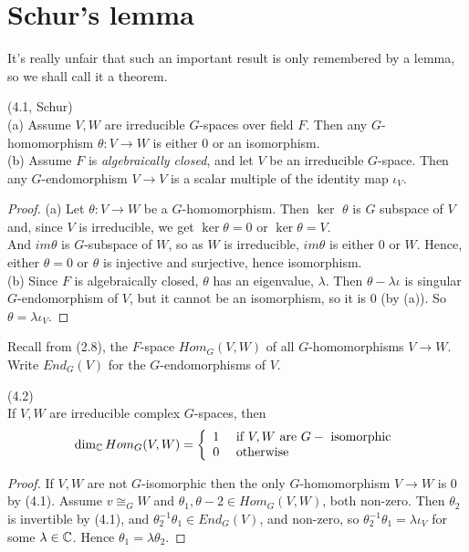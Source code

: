 \documentclass[a4paper]{article}
\begin{document}
\section{Schur's lemma}
It's really unfair that such an important result is only remembered by a lemma, so we shall call it a theorem.
\begin{thm} (4.1, Schur)\\
(a) Assume $V,W$ are irreducible $G$-spaces over field $F$. Then any $G$-homomorphism $\theta:V \to W$ is either $0$ or an isomorphism.\\
(b) Assume $F$ is \emph{algebraically closed}, and let $V$ be an irreducible $G$-space. Then any $G$-endomorphism $V \to V$ is a scalar multiple of the identity map $\iota_V$.
\begin{proof}
(a) Let $\theta:V \to W$ be a $G$-homomorphism. Then $\ker$ $\theta$ is $G$ subspace of $V$ and, since $V$ is irreducible, we get $\ker\theta = 0$ or $\ker\theta = V$.\\
And $im\theta$ is $G$-subspace of $W$, so as $W$ is irreducible, $im\theta$ is either $0$ or $W$. Hence, either $\theta=0$ or $\theta$ is injective and surjective, hence isomorphism.\\
(b) Since $F$ is algebraically closed, $\theta$ has an eigenvalue, $\lambda$. Then $\theta-\lambda \iota$ is singular $G$-endomorphism of $V$, but it cannot be an isomorphism, so it is $0$ (by (a)). So $\theta = \lambda \iota_V$.
\end{proof}
\end{thm}

Recall from (2.8), the $F$-space $Hom_G(V,W)$ of all $G$-homomorphisms $V \to W$. Write $End_G(V)$ for the $G$-endomorphisms of $V$.

\begin{coro} (4.2)\\
If $V,W$ are irreducible complex $G$-spaces, then
\begin{equation*}
\begin{aligned}
\dim_{\mathbb{C}} Hom_G (V,W) = \left\{\begin{array}{ll}
1 & \text{ if } V,W \text{ are } G- \text{ isomorphic}\\
0 & \text{ otherwise}
\end{array}
\right.
\end{aligned}
\end{equation*}
\begin{proof}
If $V,W$ are not $G$-isomorphic then the only $G$-homomorphism $V\to W$ is $0$ by (4.1). Assume $v \cong_G W$ and $\theta_1,\theta-2 \in Hom_G (V,W)$, both non-zero. Then $\theta_2$ is invertible by (4.1), and $\theta_2^{-1} \theta_1 \in End_G(V)$, and non-zero, so $\theta_2^{-1} \theta_1 = \lambda\iota_V$ for some $\lambda \in \mathbb{C}$. Hence $\theta_1 = \lambda\theta_2$.
\end{proof}
\end{coro}
\end{document}
